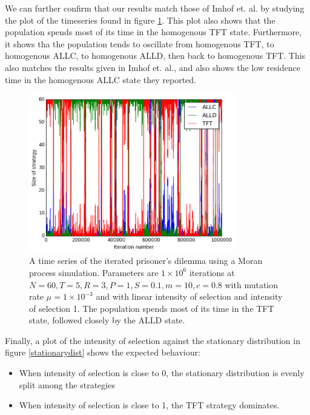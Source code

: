 We can further confirm that our results match those of Imhof et. al. by studying the plot of the timeseries found in figure \ref{timeseries}.
This plot also shows that the population spends most of its time in the homogenous TFT state.
Furthermore, it shows tha the population tends to oscillate from homogenous TFT, to homogenous ALLC, to homogenous ALLD, then back to homogenous TFT.
This also matches the results given in Imhof et. al., and also shows the low residence time in the homogenous ALLC state they reported.

\begin{figure}[h]
    \centering
    \includegraphics[width = 0.8\textwidth]{graphics/timeseries}
    \caption{A time series of the iterated prisoner's dilemma using a Moran process simulation.
    Parameters are $1 \times 10^6$ iterations at $N = 60, T = 5, R = 3, P = 1, S = 0.1, m = 10, c = 0.8$ with mutation rate $\mu = 1 \times 10^{-3}$ and with linear intensity of selection and intensity of selection 1.
    The population spends most of its time in the TFT state, followed closely by the ALLD state.}
    \label{timeseries}
\end{figure}

Finally, a plot of the intensity of selection against the stationary distribution in figure \ref{stationarydist} shows the expected behaviour:

\begin{itemize}
    \item When intensity of selection is close to 0, the stationary distribution is evenly split among the strategies
    \item When intensity of selection is close to 1, the TFT strategy dominates.
\end{itemize}


